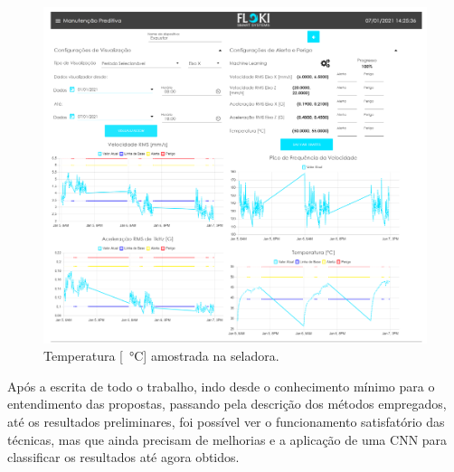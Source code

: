 \begin{figure}[H]
    \caption{Temperatura [\SI{}{\celsius}] amostrada na seladora.}
    \begin{center}
        \includegraphics[scale=0.8, page=6]{resultados/img/resultados.pdf}
    \end{center}
    \label{fig:seladora_temperatura}
\end{figure}



Após a escrita de todo o trabalho, indo desde o conhecimento mínimo para o entendimento das propostas, passando pela descrição dos métodos
empregados, até os resultados preliminares, foi possível ver o funcionamento satisfatório das técnicas, mas que ainda precisam de melhorias
e a aplicação de uma CNN para classificar os resultados até agora obtidos. 